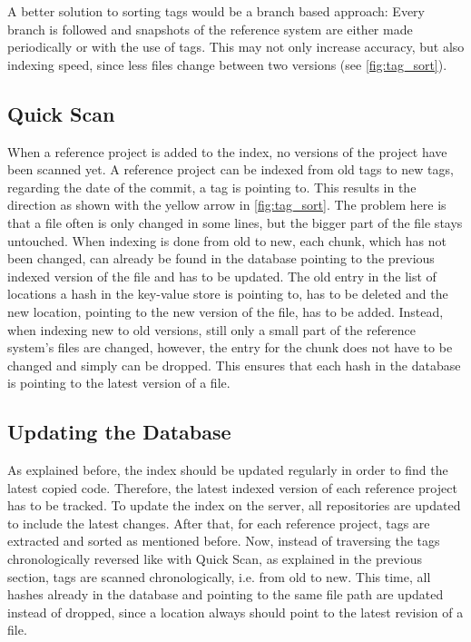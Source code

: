 A better solution to sorting tags would be a branch based approach:
Every branch is followed and snapshots of the reference system are either made periodically or with the use of tags.
This may not only increase accuracy, but also indexing speed, since less files change between two versions (see \autoref{fig:tag_sort}).

\subsection{Quick Scan}\label{section:implementation/history_analysis/quick_scan}
When a reference project is added to the index, no versions of the project have been scanned yet.
A reference project can be indexed from old tags to new tags, regarding the date of the commit, a tag is pointing to.
This results in the direction as shown with the yellow arrow in \autoref{fig:tag_sort}.
The problem here is that a file often is only changed in some lines, but the bigger part of the file stays untouched.
When indexing is done from old to new, each chunk, which has not been changed, can already be found in the database pointing to the previous indexed version of the file and has to be updated.
The old entry in the list of locations a hash in the key-value store is pointing to, has to be deleted and the new location, pointing to the new version of the file, has to be added.
Instead, when indexing new to old versions, still only a small part of the reference system's files are changed, however, the entry for the chunk does not have to be changed and simply can be dropped.
This ensures that each hash in the database is pointing to the latest version of a file.

\subsection{Updating the Database}\label{section:implementation/history_analysis/update}
As explained before, the index should be updated regularly in order to find the latest copied code.
Therefore, the latest indexed version of each reference project has to be tracked.
To update the index on the server, all repositories are updated to include the latest changes.
After that, for each reference project, tags are extracted and sorted as mentioned before.
Now, instead of traversing the tags chronologically reversed like with Quick Scan, as explained in the previous section, tags are scanned chronologically, i.e. from old to new.
This time, all hashes already in the database and pointing to the same file path are updated instead of dropped, since a location always should point to the latest revision of a file.

